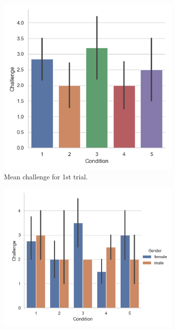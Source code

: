 \begin{figure}[H]
 \begin{subfigure}[b]{0.5\textwidth}
     \centering
     \includegraphics[scale=0.5]{Files/Plots/challenge_first_trial.png}
     \caption{Mean challenge for 1st trial.}
     \label{fig:meanChal1st}
 \end{subfigure}
  \begin{subfigure}[b]{0.5\textwidth}
     \centering
     \includegraphics[scale=0.5]{Files/Plots/challenge_first_trial_gen.png}

\end{subfigure}
\end{figure}
